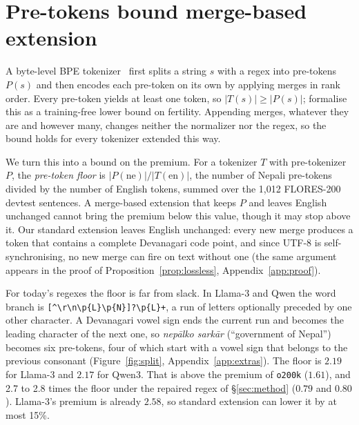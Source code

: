 \section{Pre-tokens bound merge-based extension}
\label{sec:floor}

A byte-level BPE tokenizer~\citep{sennrich-etal-2016-neural,radford2019language} first splits a string $s$ with a regex into pre-tokens $P(s)$ and then encodes each pre-token on its own by applying merges in rank order. Every pre-token yields at least one token, so $|T(s)| \ge |P(s)|$; \citet{regmi2026vowel} formalise this as a training-free lower bound on fertility. Appending merges, whatever they are and however many, changes neither the normalizer nor the regex, so the bound holds for every tokenizer extended this way.

We turn this into a bound on the premium. For a tokenizer $T$ with pre-tokenizer $P$, the \emph{pre-token floor} is $|P(\text{ne})|/|T(\text{en})|$, the number of Nepali pre-tokens divided by the number of English tokens, summed over the 1{,}012 FLORES-200 devtest sentences. A merge-based extension that keeps $P$ and leaves English unchanged cannot bring the premium below this value, though it may stop above it. Our standard extension \RI{} leaves English unchanged: every new merge produces a token that contains a complete Devanagari code point, and since UTF-8 is self-synchronising, no new merge can fire on text without one (the same argument appears in the proof of Proposition~\ref{prop:lossless}, Appendix~\ref{app:proof}).

For today's regexes the floor is far from slack. In Llama-3 and Qwen the word branch is \texttt{[\textasciicircum\textbackslash r\textbackslash n\textbackslash p\{L\}\textbackslash p\{N\}]?\textbackslash p\{L\}+}, a run of letters optionally preceded by one other character. A Devanagari vowel sign ends the current run and becomes the leading character of the next one, so \emph{nep\=alko sark\=ar} (``government of Nepal'') becomes six pre-tokens, four of which start with a vowel sign that belongs to the previous consonant (Figure~\ref{fig:split}, Appendix~\ref{app:extras}). The floor is $2.19$ for Llama-3 and $2.17$ for Qwen3. That is above the premium of \texttt{o200k} ($1.61$), and 2.7 to 2.8 times the floor under the repaired regex of \S\ref{sec:method} ($0.79$ and $0.80$). Llama-3's premium is already $2.58$, so standard extension can lower it by at most 15\%.

